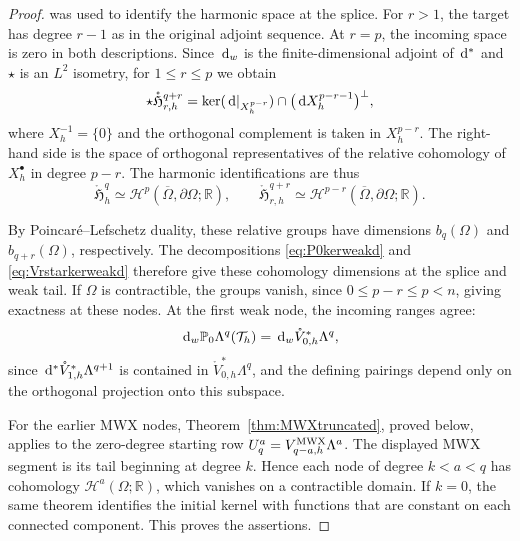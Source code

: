 \documentclass[10pt]{amsart}
\numberwithin{equation}{section}
\newcommand{\dd}{\,{\rm d}}
\begin{document}
\begin{proof}
was used to identify the harmonic space at the splice.
For $r>1$, the target has degree $r-1$ as in the original adjoint sequence.
At $r=p$, the incoming space is zero in both descriptions.
Since $\dd_w$ is the finite-dimensional adjoint of $\dd^*$ and $\star$
is an $L^2$ isometry, for $1\leq r\leq p$ we obtain
\[
\star\mathring{\mathfrak H}_{r,h}^{q+r}
=\ker(\dd|_{X_h^{p-r}})
\cap\bigl(\dd X_h^{p-r-1}\bigr)^\perp,
\]
where $X_h^{-1}=\{0\}$ and the orthogonal complement is taken in
$X_h^{p-r}$. The right-hand side is the space of orthogonal representatives
of the relative cohomology of $X_h^\bullet$ in degree $p-r$.
The harmonic identifications are thus
\begin{equation}\label{eq:relativeHarmonicIdentification}
\mathring{\mathfrak H}_h^q\simeq \mathscr H^p(\overline\Omega,\partial\Omega;\mathbb R),
\qquad
\mathring{\mathfrak H}_{r,h}^{q+r}
\simeq \mathscr H^{p-r}(\overline\Omega,\partial\Omega;\mathbb R).
\end{equation}

By Poincar\'e--Lefschetz duality, these relative groups have dimensions
$b_q(\Omega)$ and $b_{q+r}(\Omega)$, respectively. The decompositions
\eqref{eq:P0kerweakd} and \eqref{eq:Vrstarkerweakd} therefore give these
cohomology dimensions at the splice and weak tail.
If $\Omega$ is contractible, the groups vanish, since
$0\leq p-r\leq p<n$, giving exactness at these nodes.
At the first weak node, the incoming ranges agree:
\[
\dd_w\mathbb P_0\Lambda^q(\mathcal T_h)
=\dd_w\mathring V_{0,h}^{*}\Lambda^q,
\]
since $\dd^*\mathring V_{1,h}^{*}\Lambda^{q+1}$ is contained in
$\mathring V_{0,h}^{*}\Lambda^q$, and the defining pairings depend
only on the orthogonal projection onto this subspace.

For the earlier MWX nodes, Theorem~\ref{thm:MWXtruncated}, proved below,
applies to the zero-degree starting row $U_q^a=V_{q-a,h}^{\rm MWX}\Lambda^a$.
The displayed MWX segment is its tail beginning at degree $k$.
Hence each node of degree $k<a<q$ has cohomology $\mathscr H^a(\Omega;\mathbb R)$,
which vanishes on a contractible domain. If $k=0$, the same theorem
identifies the initial kernel with functions that are constant on each
connected component. This proves the assertions.
\end{proof}
\end{document}
